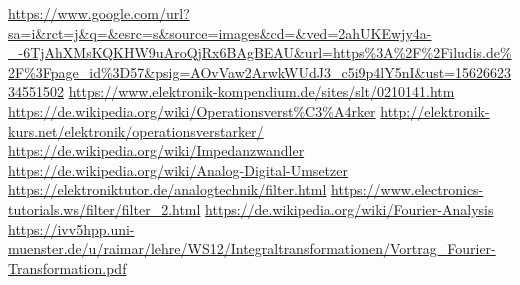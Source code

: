 \begin{thebibliography}{xxx}
		\url{https://www.google.com/url?sa=i&rct=j&q=&esrc=s&source=images&cd=&ved=2ahUKEwjy4a-_-6TjAhXMsKQKHW9uAroQjRx6BAgBEAU&url=https%3A%2F%2Filudis.de%2F%3Fpage_id%3D57&psig=AOvVaw2ArwkWUdJ3_c5i9p4lY5nI&ust=1562662334551502}
		\url{https://www.elektronik-kompendium.de/sites/slt/0210141.htm}
		\url{https://de.wikipedia.org/wiki/Operationsverst%C3%A4rker}
		\url{http://elektronik-kurs.net/elektronik/operationsverstarker/}
		\url{https://de.wikipedia.org/wiki/Impedanzwandler}
		\url{https://de.wikipedia.org/wiki/Analog-Digital-Umsetzer}
		\url{https://elektroniktutor.de/analogtechnik/filter.html}
		\url{https://www.electronics-tutorials.ws/filter/filter_2.html}
		\url{https://de.wikipedia.org/wiki/Fourier-Analysis}
		\url{https://ivv5hpp.uni-muenster.de/u/raimar/lehre/WS12/Integraltransformationen/Vortrag_Fourier-Transformation.pdf}
\end{thebibliography}
 